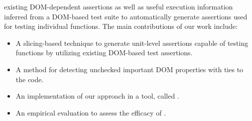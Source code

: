 existing DOM-dependent assertions as well as useful execution information inferred from a DOM-based test suite to automatically generate assertions used for testing individual \javascript functions. The main contributions of our work include:
\begin{itemize}
\item A slicing-based technique to generate unit-level assertions capable of testing \javascript functions by utilizing existing DOM-based test assertions.
\item A method for detecting unchecked important DOM properties with ties to the \javascript code.   
\item An implementation of our approach in a tool, called \tool. 
\item An empirical evaluation to assess the efficacy of \tool.
\end{itemize}
    






